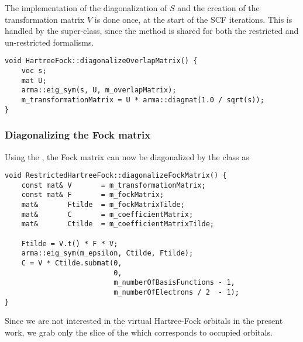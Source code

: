 \documentclass[../../master.tex]{subfiles}
\begin{document}
The implementation of the diagonalization of $S$ and the creation of the transformation matrix $V$ is done once, at the start of the SCF iterations. This is handled by the  super-class, since the method is shared for both the restricted and un-restricted formalisms. 
\begin{lstlisting}[language={[std]c++}]
void HartreeFock::diagonalizeOverlapMatrix() {
    vec s;
    mat U;
    arma::eig_sym(s, U, m_overlapMatrix);
    m_transformationMatrix = U * arma::diagmat(1.0 / sqrt(s));
}
\end{lstlisting}

\subsubsection{Diagonalizing the Fock matrix}
Using the , the Fock matrix can now be diagonalized by the  class as
\begin{lstlisting}[language={[std]c++}]
void RestrictedHartreeFock::diagonalizeFockMatrix() {
    const mat& V       = m_transformationMatrix;
    const mat& F       = m_fockMatrix;
    mat&       Ftilde  = m_fockMatrixTilde;
    mat&       C       = m_coefficientMatrix;
    mat&       Ctilde  = m_coefficientMatrixTilde;

    Ftilde = V.t() * F * V;
    arma::eig_sym(m_epsilon, Ctilde, Ftilde);
    C = V * Ctilde.submat(0,
                          0,
                          m_numberOfBasisFunctions - 1,
                          m_numberOfElectrons / 2  - 1);
}
\end{lstlisting}
Since we are not interested in the virtual Hartree-Fock orbitals in the present work, we grab only the slice of the  which corresponds to occupied orbitals.
\end{document}

